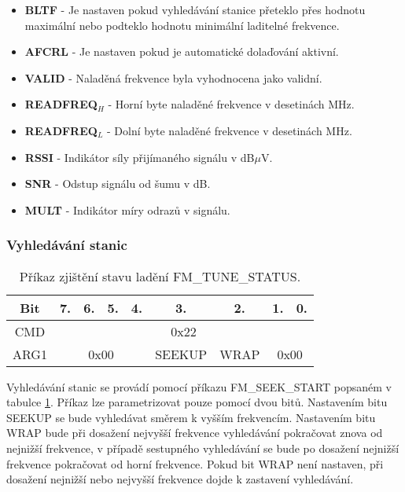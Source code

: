 \begin{itemize}
\item \textbf{BLTF} - Je nastaven pokud vyhledávání stanice přeteklo přes hodnotu maximální nebo podteklo hodnotu minimální laditelné frekvence.
\item \textbf{AFCRL} - Je nastaven pokud je automatické dolaďování aktivní.
\item \textbf{VALID} - Naladěná frekvence byla vyhodnocena jako validní. 
\item \textbf{READFREQ$_{{H}}$} - Horní byte naladěné frekvence v desetinách MHz.
\item \textbf{READFREQ$_{{L}}$} - Dolní byte naladěné frekvence v desetinách MHz.
\item \textbf{RSSI} - Indikátor síly přijímaného signálu v dB$\mu$V.
\item \textbf{SNR} - Odstup signálu od šumu v dB.
\item \textbf{MULT} - Indikátor míry odrazů v signálu.
\end{itemize}

\subsubsection{Vyhledávání stanic}
\begin{table}[ht!]
\begin{center}
\begin{tabular}{|c|c|c|c|c|c|c|c|c|}
\hline 
Bit & 7. & 6. & 5. & 4. & 3. & 2. & 1. & 0. \\ 
\hline 
CMD & \multicolumn{8}{c|}{0x22} \\ 
\hline 
ARG1 & \multicolumn{4}{c|}{0x00} & SEEKUP & WRAP & \multicolumn{2}{c|}{0x00} \\ 
\hline 
\end{tabular} 
\end{center}
\caption{Příkaz zjištění stavu ladění FM\_TUNE\_STATUS.}
\label{tab:tuner-seek} 
\end{table}

Vyhledávání stanic se provádí pomocí příkazu FM\_SEEK\_START popsaném v tabulce \ref{tab:tuner-seek}. Příkaz lze parametrizovat pouze pomocí dvou bitů. Nastavením bitu SEEKUP se bude vyhledávat směrem k vyšším frekvencím. Nastavením bitu WRAP bude při dosažení nejvyšší frekvence vyhledávání pokračovat znova od nejnižší frekvence, v případě sestupného vyhledávání se bude po dosažení nejnižší frekvence pokračovat od horní frekvence. Pokud bit WRAP není nastaven, při dosažení nejnižší nebo nejvyšší frekvence dojde k zastavení vyhledávání.

